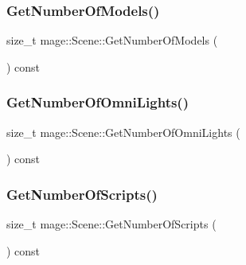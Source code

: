 \hypertarget{classmage_1_1_scene_aa5092da49a901a02802d7f1532b75210}{}\label{classmage_1_1_scene_aa5092da49a901a02802d7f1532b75210} 
\subsubsection{\texorpdfstring{Get\+Number\+Of\+Models()}{GetNumberOfModels()}}
{\footnotesize\ttfamily size\+\_\+t mage\+::\+Scene\+::\+Get\+Number\+Of\+Models (\begin{DoxyParamCaption}{ }\end{DoxyParamCaption}) const\hspace{0.3cm}{\ttfamily [noexcept]}}

\hypertarget{classmage_1_1_scene_ac043f20c6cf845244a3258593b3c2814}{}\label{classmage_1_1_scene_ac043f20c6cf845244a3258593b3c2814} 
\subsubsection{\texorpdfstring{Get\+Number\+Of\+Omni\+Lights()}{GetNumberOfOmniLights()}}
{\footnotesize\ttfamily size\+\_\+t mage\+::\+Scene\+::\+Get\+Number\+Of\+Omni\+Lights (\begin{DoxyParamCaption}{ }\end{DoxyParamCaption}) const\hspace{0.3cm}{\ttfamily [noexcept]}}

\hypertarget{classmage_1_1_scene_a33cecd2fd2b393ccac84b94ec8cc53c0}{}\label{classmage_1_1_scene_a33cecd2fd2b393ccac84b94ec8cc53c0} 
\subsubsection{\texorpdfstring{Get\+Number\+Of\+Scripts()}{GetNumberOfScripts()}}
{\footnotesize\ttfamily size\+\_\+t mage\+::\+Scene\+::\+Get\+Number\+Of\+Scripts (\begin{DoxyParamCaption}{ }\end{DoxyParamCaption}) const\hspace{0.3cm}{\ttfamily [noexcept]}}

